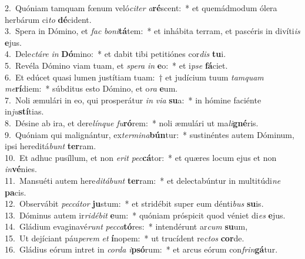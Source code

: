 {2.~}Quóniam tamquam fœnum veló\textit{ci}\textit{ter} \textit{a}\textbf{ré}scent:~* et quemádmodum ólera herbárum ci\textit{to} \textbf{dé}cident.\\
{3.~}Spera in Dómino, et \textit{fac} \textit{bo}\textit{ni}\textbf{tá}tem:~* et inhábita terram, et pascéris in divíti\textit{is} \textbf{e}jus.\\
{4.~}Dele\textit{ctá}\textit{re} \textit{in} \textbf{Dó}mino:~* et dabit tibi petitiónes cor\textit{dis} \textbf{tu}i.\\
{5.~}Revéla Dómino viam tuam, et \textit{spe}\textit{ra} \textit{in} \textbf{e}o:~* et i\textit{pse} \textbf{fá}ciet.\\
{6.~}Et edúcet quasi lumen justítiam tuam:~† et judícium tuum \textit{tam}\textit{quam} \textit{me}\textbf{rí}diem:~* súbditus esto Dómino, et o\textit{ra} \textbf{e}um.\\
{7.~}Noli æmulári in eo, qui prosperátur \textit{in} \textit{vi}\textit{a} \textbf{su}a:~* in hómine faciénte in\textit{ju}\textbf{stí}tias.\\
{8.~}Désine ab ira, et dere\textit{lín}\textit{que} \textit{fu}\textbf{ró}rem:~* noli æmulári ut ma\textit{li}\textbf{gné}ris.\\
{9.~}Quóniam qui malignántur, ex\textit{ter}\textit{mi}\textit{na}\textbf{bún}tur:~* sustinéntes autem Dóminum, ipsi hereditá\textit{bunt} \textbf{ter}ram.\\
{10.~}Et adhuc pusíllum, et non \textit{e}\textit{rit} \textit{pec}\textbf{cá}tor:~* et quæres locum ejus et non \textit{in}\textbf{vé}nies.\\
{11.~}Mansuéti autem here\textit{di}\textit{tá}\textit{bunt} \textbf{ter}ram:~* et delectabúntur in multitúdi\textit{ne} \textbf{pa}cis.\\
{12.~}Observábit \textit{pec}\textit{cá}\textit{tor} \textbf{ju}stum:~* et stridébit super eum dénti\textit{bus} \textbf{su}is.\\
{13.~}Dóminus autem ir\textit{ri}\textit{dé}\textit{bit} \textbf{e}um:~* quóniam próspicit quod véniet di\textit{es} \textbf{e}jus.\\
{14.~}Gládium evaginavé\textit{runt} \textit{pec}\textit{ca}\textbf{tó}res:~* intendérunt ar\textit{cum} \textbf{su}um,\\
{15.~}Ut dejíciant páu\textit{pe}\textit{rem} \textit{et} \textbf{í}nopem:~* ut trucídent re\textit{ctos} \textbf{cor}de.\\
{16.~}Gládius eórum intret in \textit{cor}\textit{da} \textit{i}\textbf{psó}rum:~* et arcus eórum con\textit{frin}\textbf{gá}tur.\\
